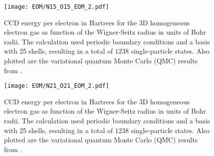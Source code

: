 \documentclass[thesis.tex]{subfiles}
\begin{document}
\begin{figure}[h]
  \texttt{[image: EOM/N15\_O15\_EOM\_2.pdf]}
  \caption{CCD energy per electron in Hartrees for the 3D homogeneous electron gas as function of the Wigner-Seitz radius in units of Bohr radii. The calculation used periodic boundary conditions and a basis with 25 shells, resulting in a total of $1238$ single-particle states. Also plotted are the variational quantum Monte Carlo (QMC) results from \cite{LOPEZ2006}.}
  \label{fig:QDground}
\end{figure}

\begin{figure}[h]
  \texttt{[image: EOM/N21\_O21\_EOM\_2.pdf]}
  \caption{CCD energy per electron in Hartrees for the 3D homogeneous electron gas as function of the Wigner-Seitz radius in units of Bohr radii. The calculation used periodic boundary conditions and a basis with 25 shells, resulting in a total of $1238$ single-particle states. Also plotted are the variational quantum Monte Carlo (QMC) results from \cite{LOPEZ2006}.}
  \label{fig:QDground}
\end{figure}
\end{document}

